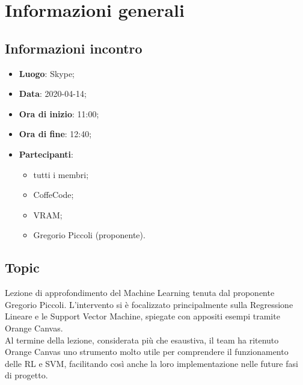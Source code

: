 \section{Informazioni generali}
\subsection{Informazioni incontro}
\begin{itemize}
\item \textbf{Luogo}: Skype;
\item \textbf{Data}: 2020-04-14;
\item \textbf{Ora di inizio}: 11:00;
\item \textbf{Ora di fine}: 12:40;
\item \textbf{Partecipanti}:
	\begin{itemize}
		\item tutti i membri;
		\item CoffeCode;
		\item VRAM;
		\item Gregorio Piccoli (proponente).
	\end{itemize}
\end{itemize}

\subsection{Topic}
Lezione di approfondimento del Machine Learning tenuta dal proponente Gregorio Piccoli. L'intervento si è focalizzato principalmente sulla Regressione Lineare e le Support Vector Machine, spiegate con appositi esempi tramite Orange Canvas.\\
Al termine della lezione, considerata più che esaustiva, il team ha ritenuto Orange Canvas uno strumento molto utile per comprendere il funzionamento delle RL e SVM, facilitando così anche la loro implementazione nelle future fasi di progetto.